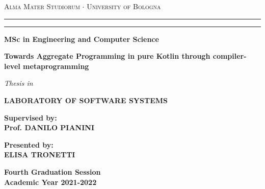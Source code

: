 \begin{titlepage}
    \begin{center}
    {{\Large{
        \textsc{Alma Mater Studiorum $\cdot$ University of Bologna}
    }}}
    \rule[0.1cm]{15.8cm}{0.1mm}
    \rule[0.5cm]{15.8cm}{0.6mm}
    {\small{\bf MSc in Engineering and Computer Science}}
    \vspace{38mm} %
    \end{center}
    \begin{center}
        \huge\bf Towards Aggregate Programming in pure Kotlin through compiler-level metaprogramming
    \end{center}
    \vspace{38mm} %
    \begin{center}
    {{\emph{Thesis in}}}
    
    \vspace{1mm}
    {{\bf{LABORATORY OF SOFTWARE SYSTEMS}}}
    \vspace{18mm}
    \end{center}
    \par
    \noindent
    \begin{minipage}[t]{0.47\textwidth}
    {\large{\bf Supervised by:\\
    Prof. DANILO PIANINI}}
    \end{minipage}
    \hfill
    \begin{minipage}[t]{0.47\textwidth}\raggedleft
    {\large{\bf Presented by:\\
    ELISA TRONETTI}}
    \end{minipage}
    \vspace{20mm}
    \begin{center}
    {\large{\bf Fourth Graduation Session\\
    Academic Year 2021-2022}}
    \end{center}
\end{titlepage}
